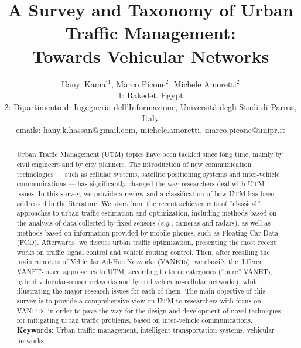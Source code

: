 \documentclass[10pt,onecolumn]{article}
\begin{document}
\title{A Survey and Taxonomy of Urban Traffic Management:\\ Towards Vehicular Networks}

\author{
\small Hany~Kamal$^1$, Marco Picone$^2$, Michele Amoretti$^2$\\
\small 1: Rakedet, Egypt\\
\small 2: Dipartimento di Ingegneria dell'Informazione, Universit\`a degli Studi di Parma, Italy\\
\small emails: hany.k.hassan@gmail.com, {michele.amoretti, marco.picone}@unipr.it
}

\date{}

\maketitle

\doublespacing

\begin{abstract}
Urban Traffic Management (UTM) topics have been tackled since long time, mainly by civil engineers and by city planners. The introduction of new communication technologies --- such as cellular systems, satellite positioning systems and inter-vehicle communications --- has significantly changed the way researchers deal with UTM issues. In this survey, we provide a review and a classification of how UTM has been addressed in the literature. We start from the recent achievements of ``classical'' approaches to urban traffic estimation and optimization, including methods based on the analysis of data collected by fixed sensors (\textit{e.g.}, cameras and radars), as well as methods based on information provided by mobile phones, such as Floating Car Data (FCD). Afterwards, we discuss urban traffic optimization, presenting the most recent works on traffic signal control and vehicle routing control. Then, after recalling the main concepts of Vehicular Ad-Hoc Networks (VANETs), we classify the different VANET-based approaches to UTM, according to three categories (``pure'' VANETs, hybrid vehicular-sensor networks and hybrid vehicular-cellular networks), while illustrating the major research issues for each of them. 
The main objective of this survey is to provide a comprehensive view on UTM to researchers with focus on VANETs, in order to pave the way for the design and development of novel techniques for mitigating urban traffic problems, based on inter-vehicle communications. 
\\
\textbf{Keywords:} Urban traffic management, intelligent transportation systems, vehicular networks.
\end{abstract}
\end{document}
